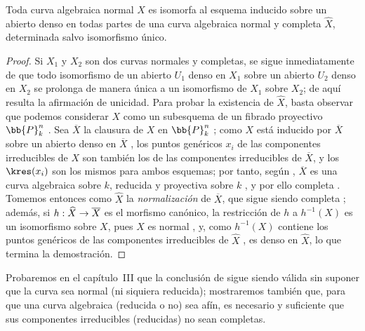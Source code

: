 \documentclass[oneside,10pt]{amsart}
\makeatletter
\newcommand{\ega@arrow}[2]{\mathchoice{#1}{#2}{#2}{#2}}
\renewcommand{\to}{\ega@arrow{\longrightarrow}{\rightarrow}}
\newcommand{\oldpage}[2][]{\marginnote{\normalfont\footnotesize\textbf{#1}~|~#2}\ignorespaces}
\let\EGAOriginalLabel\label
\renewcommand{\label}[1]{\phantomsection\EGAOriginalLabel{#1}}
\makeatother
\begin{document}
\begin{corollary}[7.4.11]
\label{II.7.4.11}
Toda curva algebraica normal $X$ es isomorfa al esquema inducido sobre un abierto denso en todas partes de una curva algebraica normal y completa $\widehat{X}$, determinada salvo isomorfismo único.
\end{corollary}

\begin{proof}
Si $X_1$ y $X_2$ son dos curvas normales y completas, se sigue inmediatamente de  que todo isomorfismo de un abierto $U_1$ denso en $X_1$ sobre un abierto $U_2$ denso en $X_2$ se prolonga de manera única a un isomorfismo de $X_1$ sobre $X_2$;
de aquí resulta la afirmación de unicidad.
Para probar la existencia de $\widehat{X}$, basta observar que podemos considerar $X$ como un subesquema de un fibrado proyectivo $\bb{P}_k^n$ .
Sea $\overline{X}$ la clausura de $X$ en $\bb{P}_k^n$ ;
como $X$ está inducido por $\overline{X}$ sobre un abierto denso en $\overline{X}$ , los puntos genéricos $x_i$ de las componentes irreducibles de $X$ son también los de las componentes irreducibles de $\overline{X}$, y los $\kres(x_i)$ son los mismos para ambos esquemas; por tanto, según , $\overline{X}$ es una curva algebraica sobre $k$, reducida  y proyectiva sobre $k$ , y por ello completa .
Tomemos entonces como $\widehat{X}$ la \emph{normalización} de $\overline{X}$, que sigue siendo completa ;
además, si $h:\widehat{X}\to\overline{X}$ es el morfismo canónico, la restricción de $h$ a $h^{-1}(X)$ es un isomorfismo sobre $X$, pues $X$ es normal , y, como $h^{-1}(X)$ contiene los puntos genéricos de las componentes irreducibles de $\widehat{X}$ , es denso en $\widehat{X}$, lo que termina la demostración.
\end{proof}

\oldpage[II]{151}
\begin{remark}[7.4.12]
\label{II.7.4.12}
Probaremos en el capítulo~III que la conclusión de  sigue siendo válida sin suponer que la curva sea normal (ni siquiera reducida);
mostraremos también que, para que una curva algebraica (reducida o no) sea afín, es necesario y suficiente que sus componentes irreducibles (reducidas) no sean completas.
\end{remark}
\end{document}

